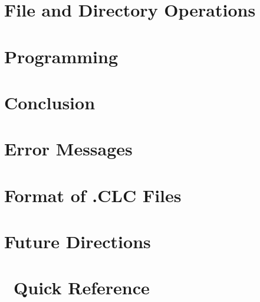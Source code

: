 \documentclass{report}
\begin{document}
\chapter{File and Directory Operations}

\chapter{Programming}

\chapter{Conclusion}

\appendix

\chapter{Error Messages}

\chapter{Format of .CLC Files}

\chapter{Future Directions}

\chapter{\CLAC\ Quick Reference}
\end{document}
